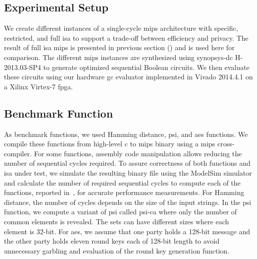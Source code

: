 \subsection{Experimental Setup} \label{sec:eval-mips-sfe-setup}
We create different instances of a single-cycle \gls{mips} architecture with specific, restricted, and full \acrshort{isa} to support a trade-off between efficiency and privacy.
The result of full \acrshort{isa} \gls{mips} is presented in previous section () and is used here for comparison.
The different \gls{mips} instances are synthesized using \gls{synopsys-dc} H-2013.03-SP4 to generate optimized sequential Boolean circuits.
We then evaluate these circuits using our hardware \acrshort{gc} evaluator implemented in Vivado 2014.4.1 on a Xilinx Virtex-7 \acrfull{fpga}.

\subsection{Benchmark Function}\label{ssect:eval-mips-sfe-bench}
As benchmark functions, we used Hamming distance, \acrfull{psi}, and \acrshort{aes} functions.
We compile these functions from high-level \gls{c} to \gls{mips} binary using a \gls{mips} cross-compiler.
For some functions, assembly code manipulation allows reducing the number of sequential cycles required.
To assure correctness of both functions and \acrshort{isa} under test, we simulate the resulting binary file using the ModelSim simulator and calculate the number of required sequential cycles to compute each of the functions, reported in~, for accurate performance measurements.
For Hamming distance, the number of cycles depends on the size of the input strings.
In the \acrshort{psi} function, we compute a variant of \acrshort{psi} called \acrfull{psi-ca} where only the number of common elements is revealed.
The sets can have different sizes where each element is 32-bit.
For \acrshort{aes}, we assume that one party holds a 128-bit message and the other party holds eleven round keys each of 128-bit length to avoid unnecessary garbling and evaluation of the round key generation function.

